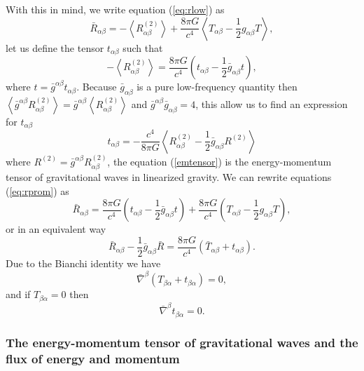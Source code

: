 With this in mind, we write equation (\ref{eq:rlow}) as
\begin{equation}
\bar{R}_{\alpha\beta}=-\left\langle R_{\alpha\beta}^{(2)}\right\rangle +\frac{8\pi G}{c^{4}}\left\langle T_{\alpha\beta}-\frac{1}{2}g_{\alpha\beta}T\right\rangle ,\label{eq:rprom}
\end{equation}
let us define the tensor $t_{\alpha\beta}$ such that
\[
-\left\langle R_{\alpha\beta}^{(2)}\right\rangle =\frac{8\pi G}{c^{4}}\left(t_{\alpha\beta}-\frac{1}{2}\bar{g}_{\alpha\beta}t\right),
\]
where $t=\bar{g}^{\alpha\beta}t_{\alpha\beta}$. Because $\bar{g}_{\alpha\beta}$
is a pure low-frequency quantity then $\left\langle \bar{g}^{\alpha\beta}R_{\alpha\beta}^{(2)}\right\rangle =\bar{g}^{\alpha\beta}\left\langle R_{\alpha\beta}^{(2)}\right\rangle $
and $\bar{g}^{\alpha\beta}\bar{g}_{\alpha\beta}=4$, this allow us
to find an expression for $t_{\alpha\beta}$
\begin{equation}
t_{\alpha\beta}=-\frac{c^{4}}{8\pi G}\left\langle R_{\alpha\beta}^{(2)}-\frac{1}{2}\bar{g}_{\alpha\beta}R^{(2)}\right\rangle \label{emtensor}
\end{equation}
where $R^{(2)}=\bar{g}^{\alpha\beta}R_{\alpha\beta}^{(2)}$, the equation
(\ref{emtensor}) is the energy-momentum tensor of gravitational waves
in linearized gravity. We can rewrite equations (\ref{eq:rprom}) as
\[
\bar{R}_{\alpha\beta}=\frac{8\pi G}{c^{4}}\left(t_{\alpha\beta}-\frac{1}{2}\bar{g}_{\alpha\beta}t\right)+\frac{8\pi G}{c^{4}}\left(T_{\alpha\beta}-\frac{1}{2}g_{\alpha\beta}T\right),
\]
or in an equivalent way
\[
\bar{R}_{\alpha\beta}-\frac{1}{2}\bar{g}_{\alpha\beta}\bar{R}=\frac{8\pi G}{c^{4}}\left(\bar{T}_{\alpha\beta}+t_{\alpha\beta}\right).
\]
Due to the Bianchi identity we have
\[
\bar{\nabla}^{\beta}\left(T_{\beta\alpha}+t_{\beta\alpha}\right)=0,
\]
and if $T_{\beta\alpha}=0$ then
\begin{equation}
\bar{\nabla}^{\beta}t_{\beta\alpha}=0.\label{eq:tbianchi}
\end{equation}

\subsubsection{The energy-momentum tensor of gravitational waves and the flux of
energy and momentum\label{sec:energy}}

